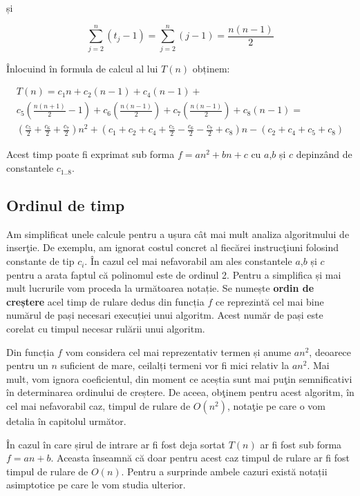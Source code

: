 și

\begin{equation}
\sum_{j=2}^{n}(t_{j}-1) = \sum_{j=2}^{n}(j-1) = \frac{n(n-1)}{2}
\end{equation}

Înlocuind în formula de calcul al lui $T(n)$ obținem:

\begin{equation}
\begin{multlined}
T(n) = c_{1}n+c_{2}(n-1)+c_{4}(n-1) + \\c_{5}(\frac{n(n+1)}{2}-1)+  c_{6}(\frac{n(n-1)}{2})+ c_{7}(\frac{n(n-1)}{2})+ c_{8}(n-1) = \\ ( \frac{c_{5}}{2}+  \frac{c_{6}}{2}+  \frac{c_{7}}{2})n^{2} + ( c_{1}+ c_{2}+ c_{4}+ \frac{c_{5}}{2} -  \frac{c_{6}}{2}  - \frac{c_{7}}{2} + c_{8})n - ( c_{2}+ c_{4}+ c_{5}+ c_{8})
\end{multlined}
\end{equation}

Acest timp poate fi exprimat sub forma $f = an^{2} + bn+c$ cu $a$,$b$ și $c$ depinzând de constantele $c_{1..8}$.

\subsection{Ordinul de timp}

Am simplificat unele calcule pentru a ușura cât mai mult analiza algoritmului de inserţie. De exemplu, am ignorat costul concret al fiecărei instrucţiuni folosind constante de tip $c_i$. În cazul cel mai nefavorabil am ales constantele  $a$,$b$ și $c$ pentru a arata faptul că polinomul este de ordinul 2. Pentru a simplifica și mai mult lucrurile vom proceda la următoarea notație. Se numește \textbf{ordin de creștere} acel timp de rulare dedus din funcția $f$ ce reprezintă cel mai bine numărul de pași necesari execuției unui algoritm. Acest număr de pași este corelat cu timpul necesar rulării unui algoritm.

Din funcția $f$ vom considera cel mai reprezentativ termen și anume $an^2$, deoarece pentru un $n$ suficient de mare, ceilalți termeni vor fi mici relativ la $an^2$. Mai mult, vom ignora coeficientul, din moment ce aceștia sunt mai puţin semnificativi în determinarea ordinului de creștere.  De aceea, obţinem pentru acest algoritm, în cel mai nefavorabil caz, timpul de rulare de $O(n^2)$, notaţie pe care o vom detalia în capitolul următor.

În cazul în care șirul de intrare ar fi fost deja sortat $T(n)$ ar fi fost sub forma $f = an+b$. Aceasta înseamnă că doar pentru acest caz timpul de rulare ar fi fost timpul de rulare de $O(n)$. Pentru a surprinde ambele cazuri există notații asimptotice pe care le vom studia ulterior.


